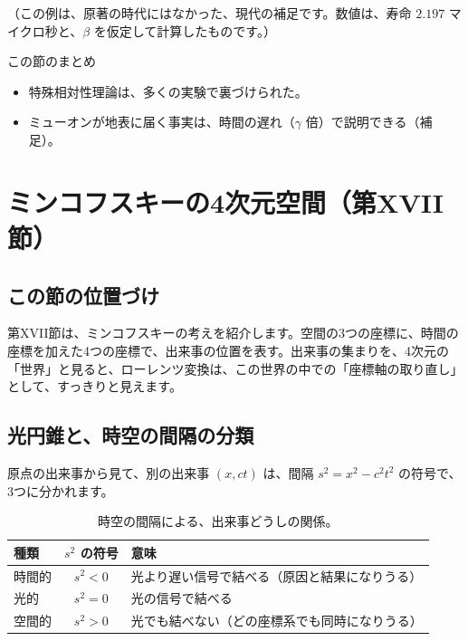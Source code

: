 \documentclass[a4paper,11pt,openany]{ltjsbook}
\begin{document}
（この例は、原著の時代にはなかった、現代の補足です。数値は、寿命 $2.197$ マイクロ秒と、$\beta$ を仮定して計算したものです。）

\begin{pointbox}{この節のまとめ}
\begin{itemize}[leftmargin=*]
\item 特殊相対性理論は、多くの実験で裏づけられた。
\item ミューオンが地表に届く事実は、時間の遅れ（$\gamma$ 倍）で説明できる（補足）。
\end{itemize}
\end{pointbox}

\chapter{ミンコフスキーの4次元空間（第XVII節）}

\section{この節の位置づけ}

第XVII節は、ミンコフスキーの考えを紹介します。空間の3つの座標に、時間の座標を加えた4つの座標で、出来事の位置を表す。出来事の集まりを、4次元の「世界」と見ると、ローレンツ変換は、この世界の中での「座標軸の取り直し」として、すっきりと見えます。

\section{光円錐と、時空の間隔の分類}

原点の出来事から見て、別の出来事 $(x,ct)$ は、間隔 $s^2=x^2-c^2t^2$ の符号で、3つに分かれます。

\begin{table}[htbp]
\centering
\begin{tabular}{lcl}
\toprule
種類 & $s^2$ の符号 & 意味\\
\midrule
時間的 & $s^2<0$ & 光より遅い信号で結べる（原因と結果になりうる）\\
光的 & $s^2=0$ & 光の信号で結べる\\
空間的 & $s^2>0$ & 光でも結べない（どの座標系でも同時になりうる）\\
\bottomrule
\end{tabular}
\caption{時空の間隔による、出来事どうしの関係。}
\end{table}
\end{document}

